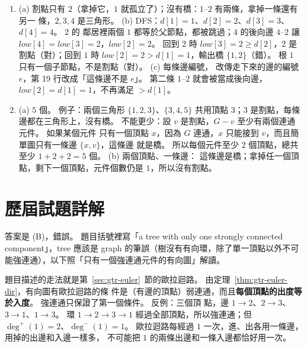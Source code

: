\begin{enumerate}
再設 $v$ 是共用的頂點，$\{v, a\} \in B_1$、$\{v, b\} \in B_2$，$a \ne b$（簡單圖）。 如果拿
掉 $v$ 後 $a$、$b$ 仍有一條路徑 $Q$ 相連，$v, a, Q, b, v$ 就是經過這兩條邊的簡單環，矛
盾。 所以拿掉 $v$ 後 $a$、$b$ 分開了，而原本它們經過 $v$ 相連，$v$ 所在的元件被切成兩塊以
上，$v$ 是割點。

\item (a) 割點只有 $2$（拿掉它，$1$ 就孤立了）；沒有橋：$1$--$2$ 有兩條，拿掉一條還有另一
條，$2, 3, 4$ 是三角形。 (b) DFS：$d[1] = 1$、$d[2] = 2$、$d[3] = 3$、$d[4] = 4$。 $2$ 的
鄰居裡兩個 $1$ 都等於父節點，都被跳過；$4$ 的後向邊 $4$--$2$ 讓 $\mathit{low}[4] =
\mathit{low}[3] = 2$，$\mathit{low}[2] = 2$。 回到 $2$ 時 $\mathit{low}[3] = 2 \ge d[2]$，$2$
是割點（對）；回到 $1$ 時 $\mathit{low}[2] = 2 > d[1] = 1$，輸出橋 $\{1, 2\}$（錯）。 根 $1$
只有一個子節點，不是割點（對）。 (c) 每條邊編號， 改傳走下來的邊的編號
$e$，第 19 行改成「這條邊不是 $e$」。 第二條 $1$--$2$ 就會被當成後向邊，$\mathit{low}[2] =
d[1] = 1$，不再滿足 $> d[1]$。

\item (a) $5$ 個。 例子：兩個三角形 $\{1, 2, 3\}$、$\{3, 4, 5\}$ 共用頂點 $3$；$3$ 是割點，每條
邊都在三角形上，沒有橋。 不能更少：設 $v$ 是割點，$G - v$ 至少有兩個連通元件。 如果某個元件
只有一個頂點 $x$，因為 $G$ 連通，$x$ 只能接到 $v$，而且簡單圖只有一條邊 $\{x, v\}$，這條邊
就是橋。 所以每個元件至少 $2$ 個頂點，總共至少 $1 + 2 + 2 = 5$ 個。 (b) 兩個頂點、一條邊：
這條邊是橋；拿掉任一個頂點，剩下一個頂點，元件個數仍是 $1$，所以沒有割點。
\end{enumerate}

\section*{歷屆試題詳解}

答案是 (B)，錯誤。 題目括號裡寫「a tree with only one strongly connected component」，tree 應該是 graph
的筆誤（樹沒有有向環，除了單一頂點以外不可能強連通），以下照「只有一個強連通元件的有向圖」解讀。

題目描述的走法就是第~\ref{sec:gtr-euler}~節的歐拉迴路。 由定理~\ref{thm:gtr-euler-dir}，有向圖有歐拉迴路的條
件是（有邊的頂點）弱連通，而且\textbf{每個頂點的出度等於入度}。 強連通只保證了第一個條件。 反例：三個頂
點，邊 $1 \to 2$、$2 \to 3$、$3 \to 1$、$1 \to 3$。 環 $1 \to 2 \to 3 \to 1$ 經過全部頂點，所以強連通；但
$\deg^{+}(1) = 2$、$\deg^{-}(1) = 1$。 歐拉迴路每經過 $1$ 一次，進、出各用一條邊，用掉的出邊和入邊一樣多，
不可能把 $1$ 的兩條出邊和一條入邊都恰好用一次。

